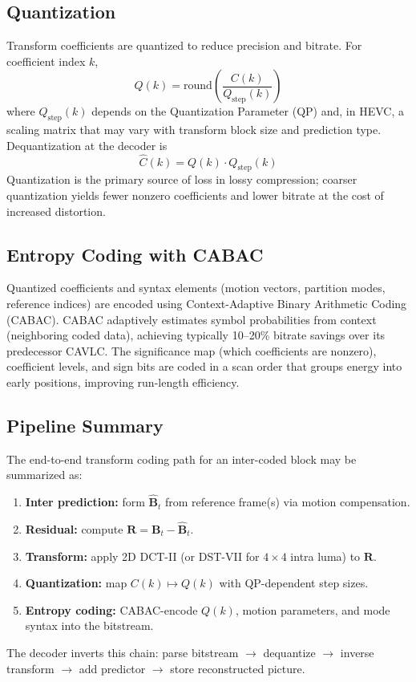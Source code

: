 \documentclass[11pt,journal,onecolumn]{IEEEtran}
\begin{document}
\subsection{Quantization}
Transform coefficients are quantized to reduce precision and bitrate. For coefficient index $k$,
\begin{equation}
Q(k) = \mathrm{round}\!\left( \frac{C(k)}{Q_{\mathrm{step}}(k)} \right)
\end{equation}
where $Q_{\mathrm{step}}(k)$ depends on the Quantization Parameter (QP) and, in HEVC, a scaling matrix that may vary with transform block size and prediction type. Dequantization at the decoder is
\begin{equation}
\hat{C}(k) = Q(k) \cdot Q_{\mathrm{step}}(k)
\end{equation}
Quantization is the primary source of loss in lossy compression; coarser quantization yields fewer nonzero coefficients and lower bitrate at the cost of increased distortion.

\subsection{Entropy Coding with CABAC}
Quantized coefficients and syntax elements (motion vectors, partition modes, reference indices) are encoded using Context-Adaptive Binary Arithmetic Coding (CABAC). CABAC adaptively estimates symbol probabilities from context (neighboring coded data), achieving typically 10--20\% bitrate savings over its predecessor CAVLC. The significance map (which coefficients are nonzero), coefficient levels, and sign bits are coded in a scan order that groups energy into early positions, improving run-length efficiency.

\subsection{Pipeline Summary}
The end-to-end transform coding path for an inter-coded block may be summarized as:
\begin{enumerate}
    \item \textbf{Inter prediction:} form $\hat{\mathbf{B}}_t$ from reference frame(s) via motion compensation.
    \item \textbf{Residual:} compute $\mathbf{R} = \mathbf{B}_t - \hat{\mathbf{B}}_t$.
    \item \textbf{Transform:} apply 2D DCT-II (or DST-VII for $4 \times 4$ intra luma) to $\mathbf{R}$.
    \item \textbf{Quantization:} map $C(k) \mapsto Q(k)$ with QP-dependent step sizes.
    \item \textbf{Entropy coding:} CABAC-encode $Q(k)$, motion parameters, and mode syntax into the bitstream.
\end{enumerate}
The decoder inverts this chain: parse bitstream $\rightarrow$ dequantize $\rightarrow$ inverse transform $\rightarrow$ add predictor $\rightarrow$ store reconstructed picture.
\end{document}
